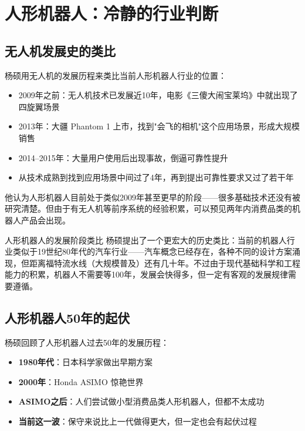 \section{人形机器人：冷静的行业判断}

\subsection{无人机发展史的类比}

杨硕用无人机的发展历程来类比当前人形机器人行业的位置：

\begin{itemize}
    \item 2009年之前：无人机技术已发展近10年，电影《三傻大闹宝莱坞》中就出现了四旋翼场景
    \item 2013年：大疆 Phantom 1 上市，找到"会飞的相机"这个应用场景，形成大规模销售
    \item 2014--2015年：大量用户使用后出现事故，倒逼可靠性提升
    \item 从技术成熟到找到应用场景中间过了4年，再到提出可靠性要求又过了若干年
\end{itemize}

他认为人形机器人目前处于类似2009年甚至更早的阶段——很多基础技术还没有被研究清楚。但由于有无人机等前序系统的经验积累，可以预见两年内消费品类的机器人产品会出现。

\begin{importantbox}{人形机器人的发展阶段类比}
杨硕提出了一个更宏大的历史类比：当前的机器人行业类似于19世纪80年代的汽车行业——汽车概念已经存在，各种不同的设计方案涌现，但距离福特流水线（大规模普及）还有几十年。不过由于现代基础科学和工程能力的积累，机器人不需要等100年，发展会快得多，但一定有客观的发展规律需要遵循。
\end{importantbox}

\subsection{人形机器人50年的起伏}

杨硕回顾了人形机器人过去50年的发展历程：
\begin{itemize}
    \item \textbf{1980年代}：日本科学家做出早期方案
    \item \textbf{2000年}：Honda ASIMO 惊艳世界
    \item \textbf{ASIMO之后}：人们尝试做小型消费品类人形机器人，但都不太成功
    \item \textbf{当前这一波}：保守来说比上一代做得更大，但一定也会有起伏过程
\end{itemize}

